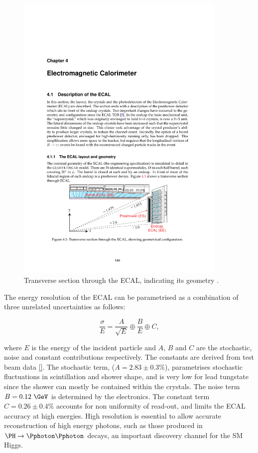 \begin{figure}[htbp]
   \includegraphics[width=0.9\textwidth]{plots/detector/ecal_layout.pdf}
\caption{Transverse section through the \ac{ECAL}, indicating its geometry \cite{Chatrchyan:2008aa}.}
\label{fig:ecal}
\end{figure}

The energy resolution of the \ac{ECAL} can be parametrised as a combination of
three unrelated uncertainties as follows:

\begin{equation}
\frac{\sigma}{E} = \frac{A}{\sqrt{E}} \oplus \frac{B}{E} \oplus C , 
\end{equation}

where $E$ is the energy of the incident particle and $A$, $B$ and $C$ are the
stochastic, noise and constant contributions respectively. The constants are
derived from test beam data \ref{}. The stochastic term, ($A=2.83\pm0.3\%$),
parametrises stochastic fluctuations in scintillation and shower shape, and is
very low for lead tungstate since the shower can mostly be contained within the
crystals. The noise term $B=0.12~\GeV$ is determined by the electronics. The
constant term $C=0.26\pm0.4\%$ accounts for non uniformity of read-out, 
and limits the \ac{ECAL} accuracy at high energies.
High resolution is essential to allow accurate reconstruction of high energy
photons, such as those produced in $\PH\to\Pphoton\Pphoton$ decays, an important
discovery channel for the \ac{SM} Higgs.

